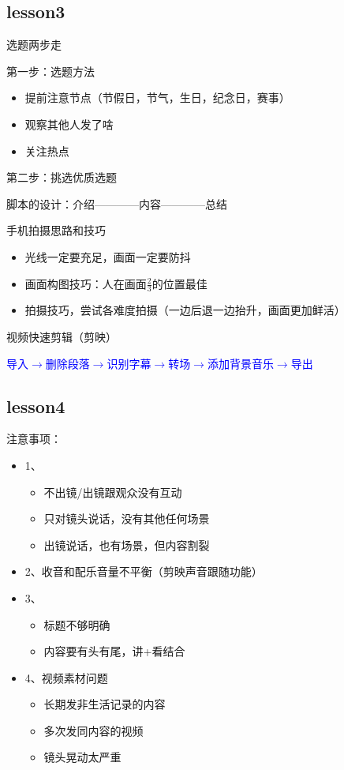 \documentclass{book}
\begin{document}
\subsection{lesson3}

选题两步走

第一步：选题方法\begin{itemize}
          \item 提前注意节点（节假日，节气，生日，纪念日，赛事）
          \item 观察其他人发了啥
          \item 关注热点
        \end{itemize}
第二步：挑选优质选题

脚本的设计：介绍————内容————总结

手机拍摄思路和技巧\begin{itemize}
           \item 光线一定要充足，画面一定要防抖
           \item 画面构图技巧：人在画面$\frac{2}{3}$的位置最佳
           \item 拍摄技巧，尝试各难度拍摄（一边后退一边抬升，画面更加鲜活）
         \end{itemize}

视频快速剪辑（剪映）

\textcolor{blue}{导入$\rightarrow$删除段落$\rightarrow$识别字幕$\rightarrow$转场$\rightarrow$添加背景音乐$\rightarrow$导出}

\subsection{lesson4}

注意事项：\begin{itemize}
       \item 1、\begin{itemize}
                 \item 不出镜/出镜跟观众没有互动
                 \item 只对镜头说话，没有其他任何场景
                 \item 出镜说话，也有场景，但内容割裂
               \end{itemize}
       \item 2、收音和配乐音量不平衡（剪映声音跟随功能）
       \item 3、\begin{itemize}
                 \item 标题不够明确
                 \item 内容要有头有尾，讲+看结合
               \end{itemize}
       \item 4、视频素材问题\begin{itemize}
                       \item 长期发非生活记录的内容
                       \item 多次发同内容的视频
                       \item 镜头晃动太严重
                     \end{itemize}
     \end{itemize}
\end{document}
